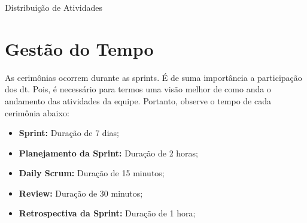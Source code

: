 \begin{quadro}[H]
	\centering\footnotesize
    \ABNTEXfontereduzida
    \caption{Distribuição de Atividades}
    \label{divisao-atividade}
\end{quadro}

\section{Gestão do Tempo}
As cerimônias ocorrem durante as \gls{sprints}. É de suma importância a participação dos \ac{dt}. Pois, é necessário para termos uma visão melhor de como anda o andamento das atividades da equipe. Portanto, observe o tempo de cada cerimônia abaixo:
\begin{itemize}
    \item \textbf{Sprint:} Duração de 7 dias;
    \item \textbf{Planejamento da Sprint:} Duração de 2 horas;
    \item \textbf{Daily Scrum:} Duração de 15 minutos;
    \item \textbf{Review:} Duração de 30 minutos;
    \item \textbf{Retrospectiva da Sprint:}  Duração de 1 hora;
\end{itemize}
